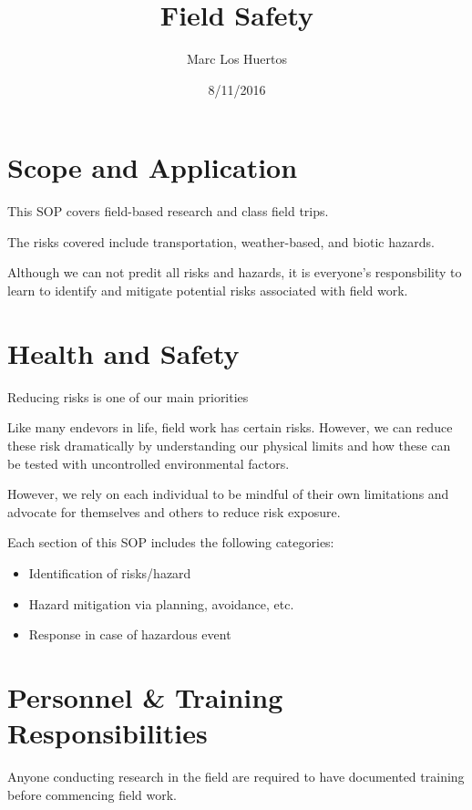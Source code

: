 \documentclass[12pt]{../SOP3_beta}
\title{Field Safety}
\date{8/11/2016}
\author{Marc Los Huertos}
\begin{document}


\maketitle

\section{Scope and Application}

\NP This SOP covers field-based research and class field trips. 

\NP The risks covered include transportation, weather-based, and biotic hazards.

\NP Although we can not predit all risks and hazards, it is everyone's responsbility to learn to identify and mitigate potential risks associated with field work.

\section{Health and Safety}

\NP Reducing risks is one of our main priorities

\NP Like many endevors in life, field work has certain risks. However, we can reduce these risk dramatically by understanding our physical limits and how these can be tested with uncontrolled environmental factors.

\NP However, we rely on each individual to be mindful of their own limitations and advocate for themselves and others to reduce risk exposure.

\NP Each section of this SOP includes the following categories:

\begin{itemize}
  \item Identification of risks/hazard
  \item Hazard mitigation via planning, avoidance, etc.
  \item Response in case of hazardous event
\end{itemize}

\section{Personnel \& Training Responsibilities}

\NP Anyone conducting research in the field are required to have documented training before commencing field work. 
\end{document}
